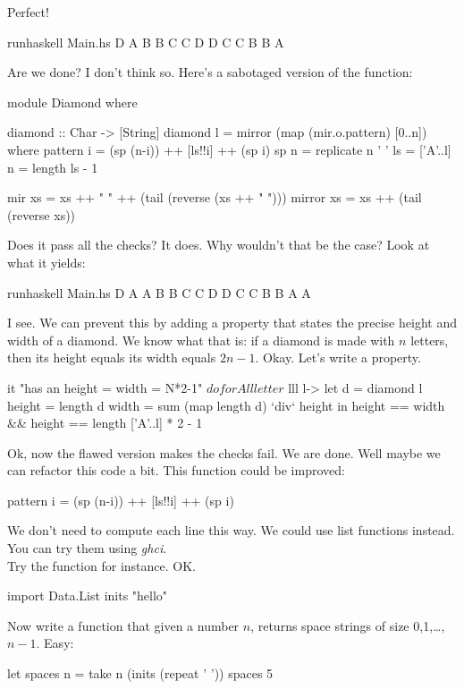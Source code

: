 \askN Perfect! 
\begin{term}
runhaskell Main.hs D\rk
   A
  B B
 C   C
D     D
 C   C
  B B
   A
\end{term}
Are we done? 
\answer I don't think so. Here's a sabotaged version of the function:
\begin{haskell}[frame=single]
module Diamond
where

diamond :: Char -> [String]
diamond l = mirror (map (mir.o.pattern) [0..n])
    where 
    pattern i = (sp (n-i)) ++ [ls!!i] ++ (sp i)
    sp n = replicate n ' '
    ls = ['A'..l]
    n = length ls - 1

    mir xs = xs ++ " " ++ (tail (reverse (xs ++ " ")))
    mirror xs = xs ++ (tail (reverse xs))
\end{haskell}
Does it pass all the checks?
\askN It does. Why wouldn't that be the case?
\answer Look at what it yields: 
\begin{term}
runhaskell Main.hs D\rk
   A A
  B   B
 C     C
D       D
 C     C
  B   B
   A A
\end{term}
\askN I see. We can prevent this by adding a property that states the precise height and width of a diamond. 
\answer We know what that is: if a diamond is made with $n$ letters, then its height equals its width equals $2n-1$.
\askN Okay. Let's write a property.
\begin{hspec}
it "has an height = width = N*2-1" $ do
forAll letter $ lll l->
    let d = diamond l
        height = length d
        width  = sum (map length d) `div` height
    in height == width
    && height == length ['A'..l] * 2 - 1
\end{hspec}
\answer Ok, now the flawed version makes the checks fail. We are done.
\askN Well maybe we can refactor this code a bit. This  function could be improved:\\
\begin{haskell}
    pattern i = (sp (n-i)) ++ [ls!!i] ++ (sp i)
\end{haskell}
We don't need to compute each line this way. We could use list functions instead. You can try them using \emph{ghci}.\\
Try the  function for instance.
\answer OK. 
\begin{term}
import Data.List\rk
inits "hello"
\end{term}
\askN Now write a function that given a number $n$, returns space strings of size 0,1,\dots,$n-1$.
\answer Easy: 
\begin{term}
let spaces n = take n (inits (repeat ' '))\rk
spaces 5\rk
[""," ","  ","   ","    "]
\end{term}
